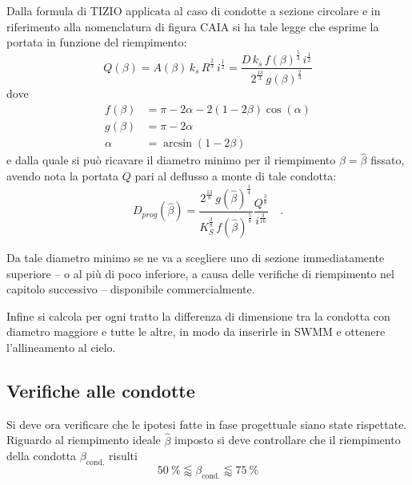 Dalla formula di TIZIO applicata al caso di condotte a sezione circolare e in riferimento alla nomenclatura di figura CAIA si ha tale legge che esprime la portata in funzione del riempimento:
\begin{equation}
    Q(\beta) 
    = A(\beta) \, k_s \, R^{\tfrac{2}{3}} \, i^{\tfrac{1}{2}} 
    = \frac{ D \, k_s \, f(\beta)^{\tfrac{5}{3}} \, i^{\tfrac{1}{2}} }{ 2^{\tfrac{13}{3}} \, g(\beta)^{\tfrac{2}{3}} }
\end{equation}
dove 
\begin{align}
    f(\beta) &= \pi - 2 \alpha - 2 (1 - 2 \beta) \cos(\alpha) \\
    g(\beta) &= \pi - 2 \alpha \\
    \alpha &= \arcsin(1 - 2 \beta)
\end{align}
e dalla quale si può ricavare il diametro minimo per il riempimento $\beta = \hat{\beta}$ fissato, avendo nota la portata $Q$ pari al deflusso a monte di tale condotta:
\begin{equation}
    D_{prog}(\hat{\beta}) = \frac{ 2^{\tfrac{13}{8}} \, g(\hat{\beta})^{\tfrac{1}{4}} }{     K_S^{\tfrac{3}{8}} \, f(\hat{\beta})^{\tfrac{5}{8}} } \frac{Q^{\tfrac{3}{8}}}{i^{\tfrac{3}{16}}} \quad .
\end{equation} 

Da tale diametro minimo se ne va a scegliere uno di sezione immediatamente superiore -- o al più di poco inferiore, a causa delle verifiche di riempimento nel capitolo successivo -- disponibile commercialmente.

Infine si calcola per ogni tratto la differenza di dimensione tra la condotta con diametro maggiore e tutte le altre, in modo da inserirle in SWMM e ottenere l'allineamento al cielo.

\subsection{Verifiche alle condotte}
Si deve ora verificare che le ipotesi fatte in fase progettuale siano state rispettate. 
Riguardo al riempimento ideale $\hat \beta$ imposto si deve controllare che il riempimento della condotta $\beta_\text{cond.}$ risulti 
\begin{equation}
    \SI{50}{\percent} \lessapprox \beta_\text{cond.} \lessapprox\SI{75}{\percent}
\end{equation}

